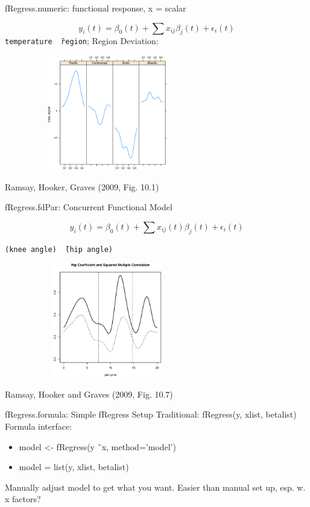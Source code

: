 \documentclass[compress]{beamer}
\begin{document}

\begin{frame}{fRegress.numeric:  functional response, x = scalar}

\[ y_i(t) = \beta_0(t) + \sum x_{ij} \beta_j(t) + \epsilon_i(t) \]
\texttt{temperature \~\ region};  Region Deviation:

\includegraphics[height=5cm, width=9cm]{figs/tempregionbeta2}

Ramsay, Hooker, Graves (2009, Fig. 10.1)

\end{frame}


\begin{frame}{fRegress.fdPar:  Concurrent Functional Model}

\[ y_i(t) = \beta_0(t) + \sum x_{ij}(t) \beta_j(t) + \epsilon_i(t) \]

\texttt{(knee angle) \~\ (hip angle)}

\includegraphics[height=5cm, width=9cm]{figs/gaitregression1a}

Ramsay, Hooker and Graves (2009, Fig. 10.7)

\end{frame}


\begin{frame}{fRegress.formula:  Simple fRegress Setup}
Traditional:  fRegress(y, xlist, betalist)
\newline \newline
Formula interface:
\begin{itemize}
    \item model <- fRegress(y \~\ x, method='model')
    \item model = list(y, xlist, betalist)
\end{itemize}
Manually adjust model to get what you want.
\newline \newline
Easier than manual set up, esp. w. x factors?

\end{frame}
\end{document}
